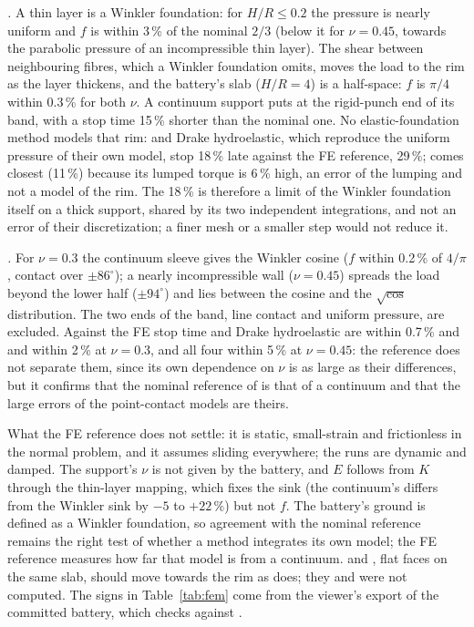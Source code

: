\emph{.} A thin layer is a Winkler foundation: for $H/R\le0.2$ the pressure is nearly
uniform and $f$ is within 3\,\% of the nominal $2/3$ (below it for $\nu=0.45$, towards the
parabolic pressure of an incompressible thin layer). The shear between neighbouring fibres, which
a Winkler foundation omits, moves the load to the rim as the layer thickens, and the battery's
slab ($H/R=4$) is a half-space: $f$ is $\pi/4$ within 0.3\,\% for both $\nu$. A continuum support
puts  at the rigid-punch end of its band, with a stop time 15\,\% shorter than the
nominal one. No elastic-foundation method models that rim:  and Drake
hydroelastic, which reproduce the uniform pressure of their own model, stop 18\,\% late against
the FE reference,  29\,\%;  comes closest (11\,\%) because its lumped
torque is 6\,\% high, an error of the lumping and not a model of the rim. The 18\,\% is therefore a
limit of the Winkler foundation itself on a thick support, shared by its two independent
integrations, and not an error of their discretization; a finer mesh or a smaller step would not
reduce it.

\emph{.} For $\nu=0.3$ the continuum sleeve gives the Winkler cosine ($f$ within
0.2\,\% of $4/\pi$, contact over $\pm86^\circ$); a nearly incompressible wall ($\nu=0.45$)
spreads the load beyond the lower half ($\pm94^\circ$) and lies between the cosine and the
$\sqrt{\cos}$ distribution. The two ends of the band, line contact and uniform pressure, are
excluded. Against the FE stop time  and Drake hydroelastic are within 0.7\,\% and
 and  within 2\,\% at $\nu=0.3$, and all four within 5\,\% at
$\nu=0.45$: the reference does not separate them, since its own dependence on $\nu$ is as large as
their differences, but it confirms that the nominal reference of  is that of a
continuum and that the large errors of the point-contact models are theirs.

What the FE reference does not settle: it is static, small-strain and frictionless in the normal
problem, and it assumes sliding everywhere; the runs are dynamic and damped. The support's
$\nu$ is not given by the battery, and $E$ follows from $K$ through the thin-layer mapping, which
fixes the sink (the continuum's differs from the Winkler sink by $-5$ to $+22\,\%$) but not $f$.
The battery's ground is defined as a Winkler foundation, so agreement with the nominal reference
remains the right test of whether a method integrates its own model; the FE reference measures
how far that model is from a continuum.  and , flat faces on the same
slab, should move towards the rim as  does; they and  were not computed. The
signs in Table~\ref{tab:fem} come from the viewer's export of the committed battery, which
 checks against .

